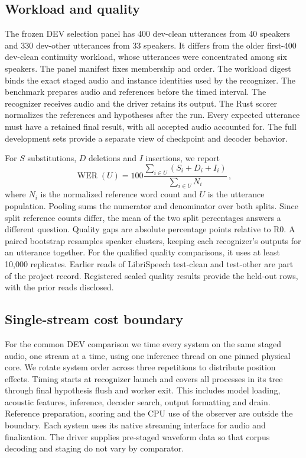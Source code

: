 \documentclass[conference]{IEEEtran}
\begin{document}
\subsection{Workload and quality}

The frozen DEV selection panel has 400 dev-clean utterances from 40 speakers
and 330 dev-other utterances from 33 speakers. It differs from the older
first-400 dev-clean continuity workload, whose utterances were concentrated
among six speakers. The panel manifest fixes membership and order. The
workload digest binds the exact staged audio and instance identities used by
the recognizer. The benchmark prepares audio and references before the timed
interval. The recognizer receives audio and the driver retains its output.
The Rust scorer normalizes the references and hypotheses after the run. Every
expected utterance must have a retained final result, with all accepted audio
accounted for. The full development sets provide a separate view of checkpoint
and decoder behavior.

For $S$ substitutions, $D$ deletions and $I$ insertions, we report
\begin{equation}
  \operatorname{WER}(U)=100\frac{\sum_{i\in U}(S_i+D_i+I_i)}
                         {\sum_{i\in U}N_i}\,,
  \label{eq:wer}
\end{equation}
where $N_i$ is the normalized reference word count and $U$ is the utterance
population. Pooling sums the numerator and denominator over both splits.
Since split reference counts differ, the mean of the two split percentages
answers a different question. Quality gaps are absolute percentage points
relative to R0. A paired bootstrap resamples speaker clusters, keeping each
recognizer's outputs for an utterance together. For the qualified quality
comparisons, it uses at least 10,000 replicates. Earlier reads of LibriSpeech
test-clean and test-other are part of the project record. Registered sealed
quality results provide the held-out rows, with the prior reads disclosed.

\subsection{Single-stream cost boundary}

For the common DEV comparison we time every system on the same staged
audio, one stream at a time, using one inference thread on one pinned physical
core. We rotate system order across three repetitions to distribute position
effects. Timing starts at recognizer launch and covers all processes in its
tree through final hypothesis flush and worker exit. This includes model
loading, acoustic features, inference, decoder search, output formatting and
drain. Reference preparation, scoring and the CPU use of the observer are
outside the boundary. Each system uses its native streaming interface for audio
and finalization. The driver supplies pre-staged waveform data so that corpus
decoding and staging do not vary by comparator.
\end{document}

